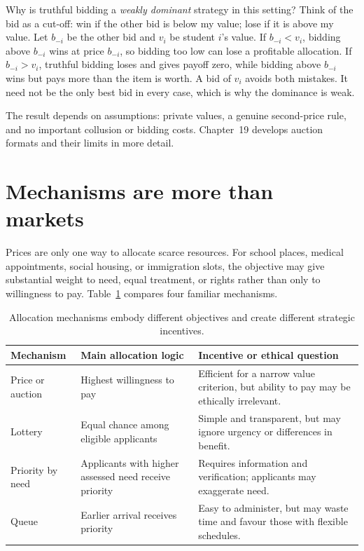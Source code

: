 Why is truthful bidding a \emph{weakly dominant} strategy in this setting?
Think of the bid as a cut-off: win if the other bid is below my value; lose if
it is above my value. Let \(b_{-i}\) be the other bid and \(v_i\) be student
\(i\)'s value. If \(b_{-i}<v_i\), bidding above \(b_{-i}\) wins at price
\(b_{-i}\), so bidding too low can lose a profitable allocation. If
\(b_{-i}>v_i\), truthful bidding loses and gives payoff zero, while bidding
above \(b_{-i}\) wins but pays more than the item is worth. A bid of \(v_i\)
avoids both mistakes. It need not be the only best bid in every case, which is
why the dominance is weak.

The result depends on assumptions: private values, a genuine second-price rule,
and no important collusion or bidding costs. Chapter~19 develops auction
formats and their limits in more detail.

\section{Mechanisms are more than markets}

Prices are only one way to allocate scarce resources. For school places,
medical appointments, social housing, or immigration slots, the objective may
give substantial weight to need, equal treatment, or rights rather than only
to willingness to pay. Table~\ref{tab:allocation-mechanisms} compares four
familiar mechanisms.

\begin{table}[htbp]
  \centering
  \small
  \renewcommand{\arraystretch}{1.18}
  \begin{tabular}{p{2.55cm}p{3.55cm}p{5.35cm}}
    \toprule
    Mechanism & Main allocation logic & Incentive or ethical question\\
    \midrule
    Price or auction & Highest willingness to pay & Efficient for a narrow value criterion, but ability to pay may be ethically irrelevant.\\
    Lottery & Equal chance among eligible applicants & Simple and transparent, but may ignore urgency or differences in benefit.\\
    Priority by need & Applicants with higher assessed need receive priority & Requires information and verification; applicants may exaggerate need.\\
    Queue & Earlier arrival receives priority & Easy to administer, but may waste time and favour those with flexible schedules.\\
    \bottomrule
  \end{tabular}
  \caption{Allocation mechanisms embody different objectives and create
  different strategic incentives.}
  \label{tab:allocation-mechanisms}
\end{table}
\FloatBarrier


